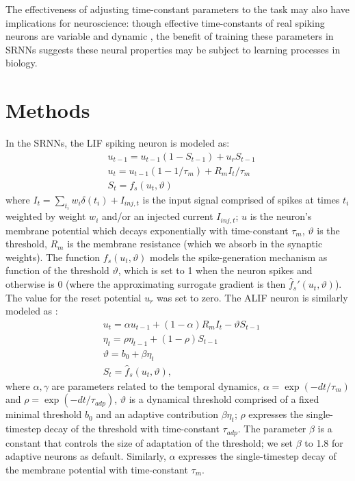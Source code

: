 \documentclass[fleqn,10pt]{wlscirep}
\begin{document}
The effectiveness of adjusting time-constant parameters to the task may also have implications for neuroscience: though effective time-constants of real spiking neurons are variable and dynamic \cite{gerstner2002spiking}, the benefit of training these parameters in SRNNs suggests these neural properties may be subject to learning processes in biology. 


\section*{Methods}

In the SRNNs, the LIF spiking neuron is modeled as:
\begin{align}
\label{eq1:LIF}
& u_{t-1} = u_{t-1}(1-S_{t-1}) + u_r S_{t-1} \\
& u_t = u_{t-1}(1-1/\tau_m)+R_m I_t /\tau_m \\
& S_t = f_s(u_t,\vartheta) 
\end{align}
where $I_t = \sum_{t_i} w_i \delta(t_i) + I_{inj,t}$ is the input signal comprised of spikes at times $t_i$ weighted by weight $w_i$ and/or an injected current $I_{inj,t}$; $u$ is the neuron's membrane potential which decays exponentially with time-constant $\tau_m$, $\vartheta$ is the threshold, $R_m$ is the membrane resistance (which we absorb in the synaptic weights). The function $f_s(u_t,\vartheta)$ models the spike-generation mechanism as function of the threshold $\vartheta$, which is set to 1 when the neuron spikes and otherwise is 0 (where the approximating surrogate gradient is then $\hat{f}_s'(u_t,\vartheta)$). The value for the reset potential $u_r$ was set to zero. The ALIF neuron is similarly modeled as :
\begin{align}
\label{eq2:adapt}
&u_t = \alpha u_{t-1} + (1-\alpha)R_m I_t - \vartheta S_{t-1}\\
&\eta_t = \rho \eta_{t-1}+ (1-\rho)S_{t-1} \\
&\vartheta = b_0+\beta\eta_t \\
&S_t = \hat{f}_s(u_t,\vartheta),
\label{eq2:adaptsn}
\end{align}
where $\alpha,\gamma$ are parameters related to the temporal dynamics, $\alpha = \exp(-dt/\tau_m)$ and $\rho = \exp(-dt/\tau_{adp})$, $\vartheta$ is a dynamical threshold comprised of a fixed minimal threshold $b_0$ and an adaptive contribution $\beta \eta_t$;  
$\rho$ expresses the single-timestep decay of the threshold with time-constant $\tau_{adp}$. The parameter $\beta$ is a constant that controls the size of adaptation of the threshold; we set $\beta$ to 1.8 for adaptive neurons as default. Similarly, $\alpha$ expresses the single-timestep decay of the membrane potential with time-constant $\tau_m$.
\end{document}
